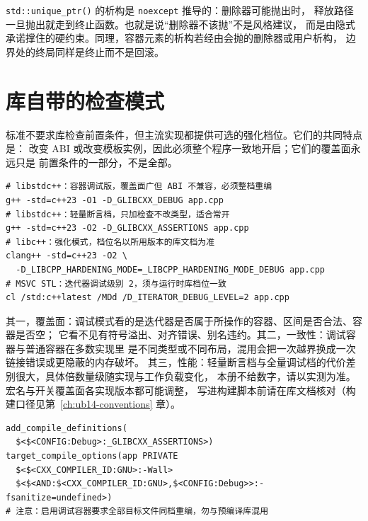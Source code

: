 \documentclass[12pt,a4paper,fontset=fandol]{ctexbook}
\newcommand{\Fn}[1]{\texttt{#1()}}
\newcommand{\Tp}[1]{\texttt{#1}}
\newcommand{\Bk}{\discretionary{}{}{}}
\begin{document}
\begin{note}[title={删除器抛出与第~\ref{ch:ub11-terminate} 章的接缝}]
\Fn{std::unique{\Bk}\_ptr} 的析构是 \Tp{noexcept} 推导的：删除器可能抛出时，
释放路径一旦抛出就走到终止函数。也就是说“删除器不该抛”不是风格建议，
而是由隐式承诺撑住的硬约束。同理，容器元素的析构若经由会抛的删除器或用户析构，
边界处的终局同样是终止而不是回滚。
\end{note}

\section{库自带的检查模式}\label{sec:ub12-check-modes}

标准不要求库检查前置条件，但主流实现都提供可选的强化档位。它们的共同特点是：
改变 ABI 或改变模板实例，因此必须整个程序一致地开启；它们的覆盖面永远只是
前置条件的一部分，不是全部。

\begin{lstlisting}[style=shellstyle, caption={三种实现的标准开启方式（宏名与覆盖面以实现文档为准）}]
# libstdc++：容器调试版，覆盖面广但 ABI 不兼容，必须整档重编
g++ -std=c++23 -O1 -D_GLIBCXX_DEBUG app.cpp
# libstdc++：轻量断言档，只加检查不改类型，适合常开
g++ -std=c++23 -O2 -D_GLIBCXX_ASSERTIONS app.cpp
# libc++：强化模式，档位名以所用版本的库文档为准
clang++ -std=c++23 -O2 \
  -D_LIBCPP_HARDENING_MODE=_LIBCPP_HARDENING_MODE_DEBUG app.cpp
# MSVC STL：迭代器调试级别 2，须与运行时库档位一致
cl /std:c++latest /MDd /D_ITERATOR_DEBUG_LEVEL=2 app.cpp
\end{lstlisting}

\begin{warning}[title={库检查模式不是消毒器}]
其一，覆盖面：调试模式看的是迭代器是否属于所操作的容器、区间是否合法、容器是否空；
它看不见有符号溢出、对齐错误、别名违约。其二，一致性：调试容器与普通容器在多数实现里
是不同类型或不同布局，混用会把一次越界换成一次链接错误或更隐蔽的内存破坏。
其三，性能：轻量断言档与全量调试档的代价差别很大，具体倍数量级随实现与工作负载变化，
本册不给数字，请以实测为准。宏名与开关覆盖面各实现版本都可能调整，
写进构建脚本前请在库文档核对（构建口径见第~\ref{ch:ub14-conventions} 章）。
\end{warning}

\begin{lstlisting}[style=cmakestyle, caption={让检查档位与编译器绑定的最小门禁}]
add_compile_definitions(
  $<$<CONFIG:Debug>:_GLIBCXX_ASSERTIONS>)
target_compile_options(app PRIVATE
  $<$<CXX_COMPILER_ID:GNU>:-Wall>
  $<$<AND:$<CXX_COMPILER_ID:GNU>,$<CONFIG:Debug>>:-fsanitize=undefined>)
# 注意：启用调试容器要求全部目标文件同档重编，勿与预编译库混用
\end{lstlisting}
\end{document}

